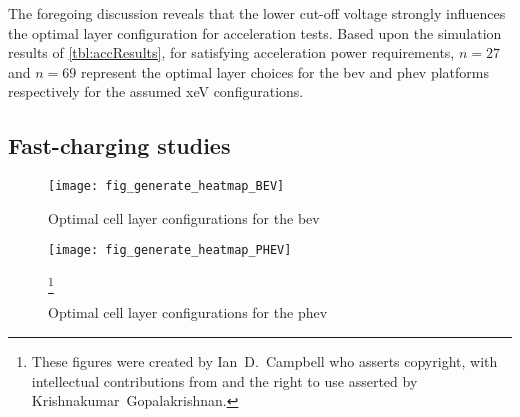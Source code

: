 The foregoing  discussion reveals  that the lower cut-off  voltage strongly
influences  the optimal layer   configuration  for   acceleration  tests.  
Based upon the simulation results of \cref{tbl:accResults},  for satisfying
acceleration power requirements, ${n = 27}$ and ${n=69}$ represent the optimal
layer choices for the \gls{bev} and \gls{phev} platforms respectively for the
assumed \gls{xeV} configurations.

\subsection{Fast-charging studies}\label{sec:fastchgresults}

\begin{figure}[p]
    \begin{minipage}[t]{\textwidth}
        \centering
        \texttt{[image: fig\_generate\_heatmap\_BEV]}
        \captionsetup{labelsep=note}
        \caption[Optimal cell layer configurations for the  for a range of fast charging powers and thermal conditions]{Optimal cell layer configurations for the \gls{bev}}
        \label{fig:fig_generate_heatmap_BEV}
        \setcounter{footnote}{8}
        \vspace*{\floatsep}
        \texttt{[image: fig\_generate\_heatmap\_PHEV]}
        \caption[Optimal cell layer configurations for the  for a range of
        fast charging powers and thermal conditions]{Optimal cell layer configurations for the \gls{phev}}
        \label{fig:fig_generate_heatmap_PHEV}
        \mpfootnotes[1]
        \footnote{These figures were created by \mbox{Ian D.\ Campbell} who asserts copyright,
            with intellectual contributions from and the right to use asserted by
        \mbox{Krishnakumar Gopalakrishnan}.}
    \end{minipage}
\end{figure}

